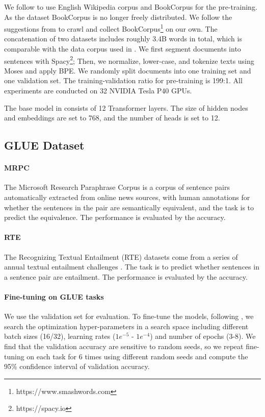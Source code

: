 \documentclass{article}
\begin{document}
We follow \citet{devlin2018bert} to use English Wikipedia corpus and BookCorpus for the pre-training. As the dataset BookCorpus \citep{moviebook} is no longer freely distributed. We follow the suggestions from \citet{devlin2018bert} to crawl and collect BookCorpus\footnote{https://www.smashwords.com} on our own. The concatenation of two datasets includes roughly 3.4B words in total, which is comparable with the data corpus used in \citet{devlin2018bert}. We first segment documents into sentences with Spacy\footnote{https://spacy.io}; Then, we normalize, lower-case, and tokenize texts using Moses \citep{koehn2007moses} and apply BPE\citep{BPE}. We randomly split documents into one training set and one validation set. The training-validation ratio for pre-training is 199:1. All experiments are conducted on 32 NVIDIA Tesla P40 GPUs.

The base model in \citet{devlin2018bert} consists of 12 Transformer layers. The size of hidden nodes and embeddings are set to 768, and the number of heads is set to 12. 

\subsection{GLUE Dataset}

\paragraph{MRPC} The Microsoft Research Paraphrase Corpus \citep{dolan2005automatically} is a corpus of sentence pairs automatically extracted from online news sources, with human annotations for whether the sentences in the pair are semantically equivalent, and the task is to predict the equivalence. The performance is evaluated by the accuracy.

\paragraph{RTE} The Recognizing Textual Entailment (RTE) datasets come from a series of annual textual entailment challenges \citep{bentivogli2009fifth}. The task is to predict whether sentences in a sentence pair are entailment. The performance is evaluated by the accuracy.

\paragraph{Fine-tuning on GLUE tasks} We use the validation set for evaluation. To fine-tune the models, following \citet{devlin2018bert, liu2019roberta}, we search the optimization hyper-parameters in a search space including different batch sizes (16/32), learning rates ($1e^{-5}$ - $1e^{-4}$) and number of epochs (3-8). We find that the validation accuracy are sensitive to random seeds, so we repeat fine-tuning on each task for 6 times using different random seeds and compute the 95\% confidence interval of validation accuracy.
\end{document}
